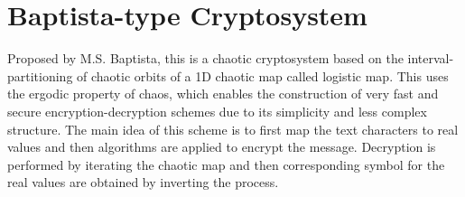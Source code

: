 \section{Baptista-type Cryptosystem}
Proposed by M.S. Baptista, this is a chaotic cryptosystem based on the interval-partitioning of chaotic orbits of a 1D chaotic map called logistic map. This uses the ergodic property of chaos, which enables the construction of very fast and secure encryption-decryption schemes due to its simplicity and less complex structure. The main idea of this scheme is to first map the text characters to real values and then algorithms are applied to encrypt the message. Decryption is performed by iterating the chaotic map and then corresponding symbol for the real values are obtained by inverting the process.

